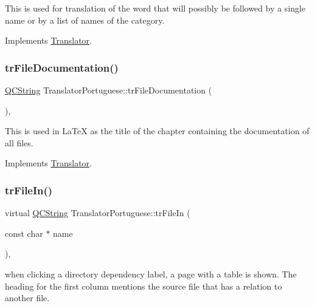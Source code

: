 This is used for translation of the word that will possibly be followed by a single name or by a list of names of the category. 

Implements \mbox{\hyperlink{class_translator}{Translator}}.

\mbox{\label{class_translator_portuguese_a94df9bb8dedf2406561433e61c1dab48}} 
\subsubsection{\texorpdfstring{trFileDocumentation()}{trFileDocumentation()}}
{\footnotesize\ttfamily \mbox{\hyperlink{class_q_c_string}{Q\+C\+String}} Translator\+Portuguese\+::tr\+File\+Documentation (\begin{DoxyParamCaption}{ }\end{DoxyParamCaption})\hspace{0.3cm}{\ttfamily [inline]}, {\ttfamily [virtual]}}

This is used in La\+TeX as the title of the chapter containing the documentation of all files. 

Implements \mbox{\hyperlink{class_translator}{Translator}}.

\mbox{\label{class_translator_portuguese_a90125a340ab8e625479c613d086624ed}} 
\subsubsection{\texorpdfstring{trFileIn()}{trFileIn()}}
{\footnotesize\ttfamily virtual \mbox{\hyperlink{class_q_c_string}{Q\+C\+String}} Translator\+Portuguese\+::tr\+File\+In (\begin{DoxyParamCaption}\item[{const char $\ast$}]{name }\end{DoxyParamCaption})\hspace{0.3cm}{\ttfamily [inline]}, {\ttfamily [virtual]}}

when clicking a directory dependency label, a page with a table is shown. The heading for the first column mentions the source file that has a relation to another file. 


